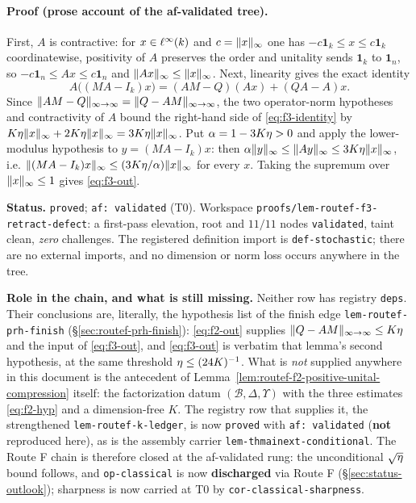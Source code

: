 \paragraph{Proof (prose account of the af-validated tree).}
First, $A$ is contractive: for $x\in\ell^{\infty}(k)$ and $c=\lVert x \rVert_{\infty}$ one has
$-c\mathbf 1_{k}\le x\le c\mathbf 1_{k}$ coordinatewise, positivity of $A$ preserves the
order and unitality sends $\mathbf 1_{k}$ to $\mathbf 1_{n}$, so
$-c\mathbf 1_{n}\le Ax\le c\mathbf 1_{n}$ and $\lVert Ax \rVert_{\infty}\le\lVert x \rVert_{\infty}$. Next, linearity gives
the exact identity
\begin{equation}\label{eq:f3-identity}
  A\bigl((MA-I_{k})x\bigr)=(AM-Q)(Ax)+(QA-A)x .
\end{equation}
Since $\lVert AM-Q \rVert_{\infty\to\infty}=\lVert Q-AM \rVert_{\infty\to\infty}$, the two operator-norm hypotheses and contractivity of
$A$ bound the right-hand side of \eqref{eq:f3-identity} by
$K\eta\lVert x \rVert_{\infty}+2K\eta\lVert x \rVert_{\infty}=3K\eta\lVert x \rVert_{\infty}$. Put $\alpha=1-3K\eta>0$ and apply
the lower-modulus hypothesis to $y=(MA-I_{k})x$: then
$\alpha\lVert y \rVert_{\infty}\le\lVert Ay \rVert_{\infty}\le3K\eta\lVert x \rVert_{\infty}$, i.e.
$\lVert (MA-I_{k})x \rVert_{\infty}\le(3K\eta/\alpha)\lVert x \rVert_{\infty}$ for every $x$. Taking the supremum over
$\lVert x \rVert_{\infty}\le1$ gives \eqref{eq:f3-out}.

\medskip
\noindent\textbf{Status.} \texttt{proved}; \texttt{af: validated} (T0). Workspace
\texttt{proofs/lem-routef-f3-retract-defect}: a first-pass elevation, root and $11/11$ nodes
\texttt{validated}, taint clean, \emph{zero} challenges. The registered definition import is
\texttt{def-stochastic}; there are no external imports, and no dimension or norm loss occurs
anywhere in the tree.

\noindent\textbf{Role in the chain, and what is still missing.} Neither row has registry
\texttt{deps}. Their conclusions are, literally, the hypothesis list of the finish edge
\texttt{lem-routef-prh-finish} (\S\ref{sec:routef-prh-finish}): \eqref{eq:f2-out} supplies
$\lVert Q-AM \rVert_{\infty\to\infty}\le K\eta$ and the input of \eqref{eq:f3-out}, and \eqref{eq:f3-out} is
verbatim that lemma's second hypothesis, at the same threshold
$\eta\le(24K)^{-1}$. What is \emph{not} supplied anywhere in this document is the
antecedent of Lemma~\ref{lem:routef-f2-positive-unital-compression} itself: the
factorization datum $(\mathcal B,\Delta,\Upsilon)$ with the three estimates
\eqref{eq:f2-hyp} and a dimension-free $K$. The registry row that supplies it,
the strengthened \texttt{lem-routef-k-ledger}, is now \texttt{proved} with
\texttt{af: validated} (\textbf{not} reproduced here), as is the assembly carrier
\texttt{lem-thmainext-conditional}. The Route F chain is therefore
closed at the af-validated rung: the unconditional $\sqrt{\eta}$ bound follows, and
\texttt{op-classical} is now \textbf{discharged} via Route F
(\S\ref{sec:status-outlook}); sharpness is now carried at T0 by \texttt{cor-classical-sharpness}.
